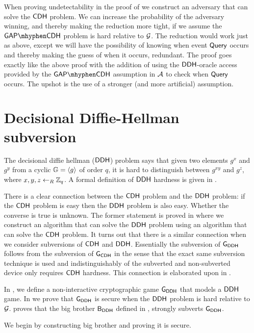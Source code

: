 When proving undetectability in the proof of  we construct an adversary that can solve the $\mathsf{CDH}$ problem. We can increase the probability of the adversary winning, and thereby making the reduction more tight, if we assume the $\gapcdh$ problem is hard relative to $\operatorname{\mathcal{G}}$. The reduction would work just as above, except we will have the possibility of knowing when event $\mathsf{Query}$ occurs and thereby making the guess of when it occurs, redundant. The proof goes exactly like the above proof with the addition of using the $\mathsf{DDH}$-oracle access provided by the $\gapcdh$ assumption in $\mathcal{A}$ to check when $\mathsf{Query}$ occurs. The upshot is the use of a stronger (and more artificial) assumption. 

\section{Decisional Diffie-Hellman subversion}

The decisional diffie hellman ($\mathsf{DDH}$) problem says that given two elements $g^x$ and $g^y$ from a cyclic $\mathbb{G} = \langle g\rangle$ of order $q$, it is hard to distinguish between $g^{xy}$ and $g^z$, where $x,y,z\leftarrow_R\mathbb{Z}_q$. A formal definition of $\mathsf{DDH}$ hardness is given in .

There is a clear connection between the $\mathsf{CDH}$ problem and the $\mathsf{DDH}$ problem: if the $\mathsf{CDH}$ problem is easy then the $\mathsf{DDH}$ problem is also easy. Whether the converse is true is unknown. The former statement is proved in  where we construct an algorithm that can solve the $\mathsf{DDH}$ problem using an algorithm that can solve the $\mathsf{CDH}$ problem. It turns out that there is a similar connection when we consider subversions of $\mathsf{CDH}$ and $\mathsf{DDH}$. Essentially the subversion of $\operatorname{\mathsf{G}}_{\mathsf{DDH}}$ follows from the subversion of $\operatorname{\mathsf{G}}_{\mathsf{CDH}}$ in the sense that the exact same subversion technique is used and indistinguishably of the subverted and non-subverted device only requires $\mathsf{CDH}$ hardness. This connection is elaborated upon in .

In , we define a non-interactive cryptographic game $\operatorname{\mathsf{G}}_{\mathsf{DDH}}$ that models a $\mathsf{DDH}$ game. In  we prove that $\operatorname{\mathsf{G}}_{\mathsf{DDH}}$ is secure when the $\mathsf{DDH}$ problem is hard relative to $\operatorname{\mathcal{G}}$.  proves that the big brother $\mathsf{B}_{\mathsf{DDH}}$ defined in , strongly subverts $\operatorname{\mathsf{G}}_{\mathsf{DDH}}$. 

We begin by constructing big brother and proving it is secure. 

